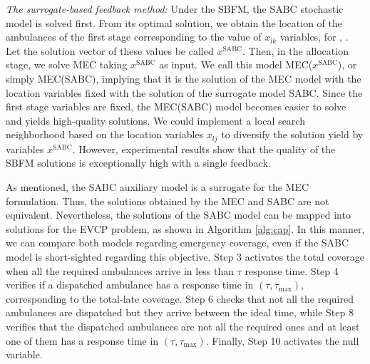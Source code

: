 \textit{The surrogate-based feedback method:} Under the SBFM,
the SABC stochastic model is solved first.
From its optimal solution, we obtain the location of the ambulances of the first stage corresponding to the value of $x_{lk}$ variables, for , . Let the solution vector of these values be called $x^\text{SABC}$. 
Then, in the allocation stage, we solve MEC 
taking $x^\text{SABC}$ as input. We call this
model MEC($x^\text{SABC}$), or simply MEC(SABC), implying
that it is the solution of the MEC model with the location variables fixed with the solution of the surrogate model SABC.
Since the first stage variables are fixed, the MEC(SABC) model becomes easier to solve and yields high-quality solutions. We could implement a local search neighborhood based on the location variables $x_{lj}$ to diversify the solution yield by variables $x^\text{SABC}$. However, experimental results show that the quality of the SBFM solutions is exceptionally high with a single feedback.  

As mentioned, the SABC auxiliary model is a surrogate for the MEC for\-mu\-la\-tion. Thus, the solutions obtained by the MEC and SABC are not equivalent. Nevertheless, the solutions of the SABC model can be mapped into solutions for the EVCP problem, as shown in Algorithm \ref{alg:cap}. In this manner, we can compare both models regarding emergency coverage, even if the SABC model is short-sighted regarding this objective. 
Step 3 activates the total coverage when all the required ambulances arrive in less than $\tau$ response time. Step 4 verifies if a dispatched ambulance has a response time in $(\tau,\tau_{\max})$, corresponding to the total-late coverage. Step 6 checks that not all the required ambulances are dispatched but they arrive between the ideal time, while Step 8 verifies that the dispatched ambulances are not all the required ones and at least one of them has a response time in $(\tau,\tau_{\max})$. Finally, Step 10 activates the null variable.


